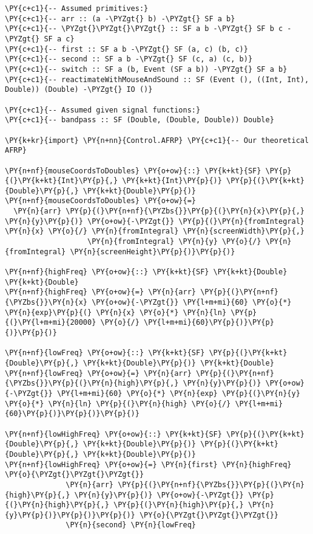 \begin{Verbatim}[commandchars=\\\{\}]
\PY{c+c1}{-- Assumed primitives:}
\PY{c+c1}{-- arr :: (a -\PYZgt{} b) -\PYZgt{} SF a b}
\PY{c+c1}{-- \PYZgt{}\PYZgt{}\PYZgt{} :: SF a b -\PYZgt{} SF b c -\PYZgt{} SF a c}
\PY{c+c1}{-- first :: SF a b -\PYZgt{} SF (a, c) (b, c)}
\PY{c+c1}{-- second :: SF a b -\PYZgt{} SF (c, a) (c, b)}
\PY{c+c1}{-- switch :: SF a (b, Event (SF a b)) -\PYZgt{} SF a b}
\PY{c+c1}{-- reactimateWithMouseAndSound :: SF (Event (), ((Int, Int), Double)) (Double) -\PYZgt{} IO ()}

\PY{c+c1}{-- Assumed given signal functions:}
\PY{c+c1}{-- bandpass :: SF (Double, (Double, Double)) Double}

\PY{k+kr}{import} \PY{n+nn}{Control.AFRP} \PY{c+c1}{-- Our theoretical AFRP}

\PY{n+nf}{mouseCoordsToDoubles} \PY{o+ow}{::} \PY{k+kt}{SF} \PY{p}{(}\PY{k+kt}{Int}\PY{p}{,} \PY{k+kt}{Int}\PY{p}{)} \PY{p}{(}\PY{k+kt}{Double}\PY{p}{,} \PY{k+kt}{Double}\PY{p}{)}
\PY{n+nf}{mouseCoordsToDoubles} \PY{o+ow}{=} 
  \PY{n}{arr} \PY{p}{(}\PY{n+nf}{\PYZbs{}}\PY{p}{(}\PY{n}{x}\PY{p}{,} \PY{n}{y}\PY{p}{)} \PY{o+ow}{-\PYZgt{}} \PY{p}{(}\PY{n}{fromIntegral} \PY{n}{x} \PY{o}{/} \PY{n}{fromIntegral} \PY{n}{screenWidth}\PY{p}{,} 
                   \PY{n}{fromIntegral} \PY{n}{y} \PY{o}{/} \PY{n}{fromIntegral} \PY{n}{screenHeight}\PY{p}{)}\PY{p}{)}

\PY{n+nf}{highFreq} \PY{o+ow}{::} \PY{k+kt}{SF} \PY{k+kt}{Double} \PY{k+kt}{Double}
\PY{n+nf}{highFreq} \PY{o+ow}{=} \PY{n}{arr} \PY{p}{(}\PY{n+nf}{\PYZbs{}}\PY{n}{x} \PY{o+ow}{-\PYZgt{}} \PY{l+m+mi}{60} \PY{o}{*} \PY{n}{exp}\PY{p}{(} \PY{n}{x} \PY{o}{*} \PY{n}{ln} \PY{p}{(}\PY{l+m+mi}{20000} \PY{o}{/} \PY{l+m+mi}{60}\PY{p}{)}\PY{p}{)}\PY{p}{)}

\PY{n+nf}{lowFreq} \PY{o+ow}{::} \PY{k+kt}{SF} \PY{p}{(}\PY{k+kt}{Double}\PY{p}{,} \PY{k+kt}{Double}\PY{p}{)} \PY{k+kt}{Double}
\PY{n+nf}{lowFreq} \PY{o+ow}{=} \PY{n}{arr} \PY{p}{(}\PY{n+nf}{\PYZbs{}}\PY{p}{(}\PY{n}{high}\PY{p}{,} \PY{n}{y}\PY{p}{)} \PY{o+ow}{-\PYZgt{}} \PY{l+m+mi}{60} \PY{o}{*} \PY{n}{exp} \PY{p}{(}\PY{n}{y} \PY{o}{*} \PY{n}{ln} \PY{p}{(}\PY{n}{high} \PY{o}{/} \PY{l+m+mi}{60}\PY{p}{)}\PY{p}{)}\PY{p}{)}

\PY{n+nf}{lowHighFreq} \PY{o+ow}{::} \PY{k+kt}{SF} \PY{p}{(}\PY{k+kt}{Double}\PY{p}{,} \PY{k+kt}{Double}\PY{p}{)} \PY{p}{(}\PY{k+kt}{Double}\PY{p}{,} \PY{k+kt}{Double}\PY{p}{)}
\PY{n+nf}{lowHighFreq} \PY{o+ow}{=} \PY{n}{first} \PY{n}{highFreq} \PY{o}{\PYZgt{}\PYZgt{}\PYZgt{}} 
              \PY{n}{arr} \PY{p}{(}\PY{n+nf}{\PYZbs{}}\PY{p}{(}\PY{n}{high}\PY{p}{,} \PY{n}{y}\PY{p}{)} \PY{o+ow}{-\PYZgt{}} \PY{p}{(}\PY{n}{high}\PY{p}{,} \PY{p}{(}\PY{n}{high}\PY{p}{,} \PY{n}{y}\PY{p}{)}\PY{p}{)}\PY{p}{)} \PY{o}{\PYZgt{}\PYZgt{}\PYZgt{}}
              \PY{n}{second} \PY{n}{lowFreq}


\end{Verbatim}
